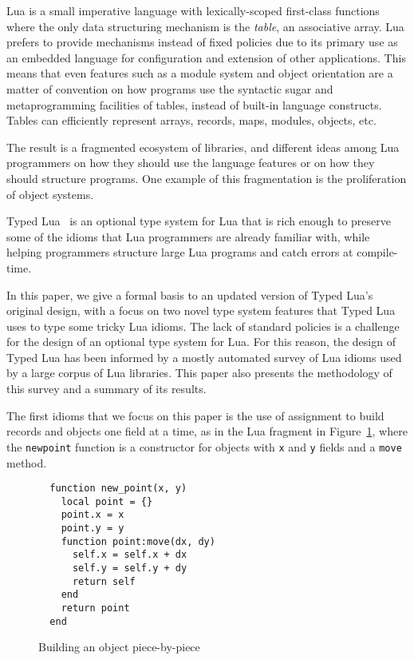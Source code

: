 \documentclass[preprint]{sigplanconf}
\begin{document}
Lua is a small imperative language with lexically-scoped first-class functions where the only data structuring
mechanism is the \emph{table}, an associative array. Lua prefers to provide mechanisms instead of fixed policies due
to its primary use as an embedded language for configuration and
extension of other applications.
This means that even features such as a module system and
object orientation are a matter of convention on how
programs use the syntactic sugar and metaprogramming
facilities of tables, instead of
built-in language constructs. Tables can efficiently represent arrays, records, maps, modules,
objects, etc. 

The result is a fragmented ecosystem of libraries, and different
ideas among Lua programmers on how they should use the language
features or on how they should structure programs. One example
of this fragmentation is the proliferation of object systems.

Typed Lua~\cite{maidl2014tl} is an optional type system for
Lua that is rich enough to preserve some of the idioms
that Lua programmers are already familiar with, while
helping programmers structure large Lua programs and
catch errors at compile-time. 

In this paper, we give a formal basis to an updated version of Typed Lua's original design, with a focus on two novel type system
features that Typed Lua uses to type some tricky Lua idioms.
The lack of standard policies is a challenge for the design of
an optional type system for Lua. For this reason, the design
of Typed Lua has been informed by a mostly automated survey
of Lua idioms used by a large corpus of Lua libraries.
This paper also presents the methodology of this survey and
a summary of its results.

The first idioms that we focus on this paper is the use of assignment to build records and objects one field at a time, as in
the Lua fragment in Figure~\ref{fig:newpoint}, where the {\tt newpoint} function
is a constructor for objects with {\tt x} and {\tt y}
fields and a {\tt move} method.

\begin{figure}[t]
\label{fig:newpoint}
\begin{verbatim}
  function new_point(x, y)
    local point = {}
    point.x = x
    point.y = y
    function point:move(dx, dy)
      self.x = self.x + dx
      self.y = self.y + dy
      return self
    end
    return point
  end
\end{verbatim}
\caption{Building an object piece-by-piece}
\end{figure}
\end{document}
